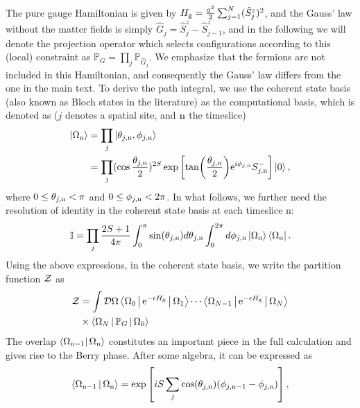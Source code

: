 \documentclass[aps,prl,reprint,twocolumn,superscriptaddress,floatfix,nofootinbib]{revtex4-1}
\begin{document}
The pure gauge Hamiltonian is given by $H_{\text g} = \frac{g^2}{2} \sum_{j=1}^N (\hat{S}^z_j)^2$, and the Gauss' law without the matter fields is simply $\hat{G}_j = \hat{S}^{z}_j - \hat{S}^{z}_{j-1}$, and in the following we will denote the projection operator which selects configurations according to this (local) constraint as $\mathbb{P}_G = \prod_j \mathbb{P}_{\hat{G}_j}$. We emphasize that the fermions are not included in this Hamiltonian, and consequently the Gauss' law differs from the one in the main text. To derive the path integral, we use the coherent state basis (also known as Bloch states in the literature) as the computational basis, which is denoted as ($j$ denotes a spatial site, and ${\rm n}$ the timeslice)
\begin{equation}
	\begin{split}
		\ket{\Omega_{\rm n}} &= \prod_{j} \ket{\theta_{j,{\rm n}},\phi_{j,{\rm n}}} \\
		&= \prod_{j} (\cos \frac{\theta_{j, {\rm n}}}{2})^{2S} \exp \left[  \tan(\frac{\theta_{j,{\rm n}}}{2}) {\rm e}^{i \phi_{j, {\rm n}}} S_{j,{\rm n}}^- \right] \ket{0},
	\end{split}
\end{equation}
where $0 \leq \theta_{j,{\rm n}} < \pi$ and $0 \leq \phi_{j,{\rm n}} < 2 \pi$. In what follows, we further need the resolution of identity in the coherent state basis at each timeslice n: 
\begin{equation}
	\mathbb{I} = \prod_j \frac{2S+1}{4 \pi} \int^{\pi}_{0} \sin(\theta_{j,{\rm n}}) d \theta_{j,{\rm n}} \int^{2\pi}_{0} d\phi_{j,{\rm n}} \ket{\Omega_{\rm n}} \bra{\Omega_{\rm n}}.
\end{equation}
Using the above expressions, in the coherent state basis, we write the partition function ${\cal Z}$ as
\begin{align}
	{\cal Z} &= \int {\cal D} \Omega \Braket{\Omega_0| {\rm e}^{-\epsilon H_{\rm g}} | \Omega_1 } 
	\cdots \Braket{\Omega_{N-1}| {\rm e}^{-\epsilon H_{\rm g}} | \Omega_{N}} \nonumber \\
	&\times \Braket{\Omega_N | \mathbb{P}_G | \Omega_0 }
\end{align}
The overlap $\bra{\Omega_{\rm n-1}} \Omega_{\rm n}\rangle$ constitutes an important piece in the full calculation and gives rise to the Berry phase. After some algebra, it can be expressed as 
\begin{equation}
	\Braket{\Omega_{\rm n-1} |\Omega_{\rm n}} = {\rm exp} \left[ i S \sum_j \cos(\theta_{j,{\rm n}}) (\phi_{j,{\rm n-1}} - \phi_{j,{\rm n}})  \right],
\end{equation}
\end{document}
